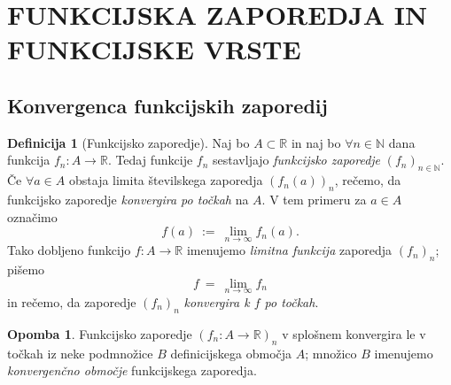 \documentclass[11pt]{article}
\theoremstyle{definition}
\newtheorem{definicija}{Definicija}[section]
\theoremstyle{definition}
\theoremstyle{definition}
\theoremstyle{theorem}
\newtheorem*{opomba}{Opomba}
\begin{document}
\pagebreak


\section{FUNKCIJSKA ZAPOREDJA IN FUNKCIJSKE VRSTE}
\vspace{0.5cm}


\subsection{Konvergenca funkcijskih zaporedij}
\vspace{0.5cm}

\begin{definicija}[Funkcijsko zaporedje]

Naj bo $A \subset \mathbb{R}$ in naj bo $\forall n \in \mathbb{N}$ dana funkcija $f_n: A \rightarrow \mathbb{R}$. Tedaj funkcije $f_n$ sestavljajo \textit{funkcijsko zaporedje} $(f_n)_{n \in \mathbb{N}}$. \\

Če $\forall a \in A$ obstaja limita številskega zaporedja $(f_n(a))_n$, rečemo, da funkcijsko zaporedje \textit{konvergira po točkah} na $A$. V tem primeru za $a \in A$ označimo 
$$f(a) ~:=~ \lim_{n \rightarrow \infty} f_n(a).$$
Tako dobljeno funkcijo $f: A \rightarrow \mathbb{R}$ imenujemo \textit{limitna funkcija} zaporedja $(f_n)_n$; pišemo 
$$f ~=~ \lim_{n \rightarrow \infty} f_n$$
in rečemo, da zaporedje $(f_n)_n$ \textit{konvergira k $f$ po točkah}.

\end{definicija}
\vspace{0.5cm}

\begin{opomba}

Funkcijsko zaporedje $(f_n: A \rightarrow \mathbb{R})_n$ v splošnem konvergira le v točkah iz neke podmnožice $B$ definicijskega območja $A$; množico $B$ imenujemo \textit{konvergenčno območje} funkcijskega zaporedja.

\end{opomba}
\vspace{0.5cm}
\end{document}
